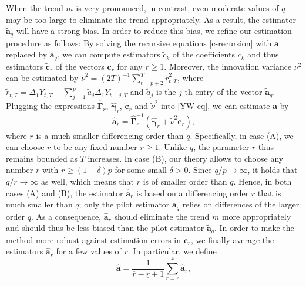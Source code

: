 \documentclass[a4paper]{scrartcl}
\begin{document}
When the trend $m$ is very pronounced, in contrast, even moderate values of $q$ may be too large to eliminate the trend appropriately. As a result, the estimator $\widetilde{\boldsymbol{a}}_q$ will have a strong bias. In order to reduce this bias, we refine our estimation procedure as follows: By solving the recursive equations \eqref{c-recursion} with $\boldsymbol{a}$ replaced by $\widetilde{\boldsymbol{a}}_q$, we can compute estimators $\widetilde{c}_k$ of the coefficients $c_k$ and thus estimators $\widetilde{\boldsymbol{c}}_r$ of the vectors $\boldsymbol{c}_r$ for any $r \ge 1$. Moreover, the innovation variance $\nu^2$ can be estimated by $\widetilde{\nu}^2 = (2T)^{-1} \sum_{t=p+2}^T \widetilde{r}_{t,T}^2$, where $\widetilde{r}_{t,T} = \Delta_1 Y_{t,T} - \sum_{j=1}^p \widetilde{a}_j \Delta_1 Y_{t-j,T}$ and $\widetilde{a}_j$ is the $j$-th entry of the vector $\widetilde{\boldsymbol{a}}_q$. Plugging the expressions $\widehat{\boldsymbol{\Gamma}}_r$, $\widehat{\boldsymbol{\gamma}}_r$, $\widetilde{\boldsymbol{c}}_r$ and $\widetilde{\nu}^2$ into \eqref{YW-eq}, we can estimate $\boldsymbol{a}$ by 
\begin{equation}\label{est-AR-SS} 
\widehat{\boldsymbol{a}}_r = \widehat{\boldsymbol{\Gamma}}_r^{-1} (\widehat{\boldsymbol{\gamma}}_r + \widetilde{\nu}^2 \widetilde{\boldsymbol{c}}_r),
\end{equation} 
where $r$ is a much smaller differencing order than $q$. Specifically, in case (A), we can choose $r$ to be any fixed number $r \ge 1$. Unlike $q$, the parameter $r$ thus remains bounded as $T$ increases. In case (B), our theory allows to choose any number $r$ with $r \ge (1+\delta) p$ for some small $\delta > 0$. Since $q/p \rightarrow \infty$, it holds that $q/r \rightarrow \infty$ as well, which means that $r$ is of smaller order than $q$. Hence, in both cases (A) and (B), the estimator $\widehat{\boldsymbol{a}}_r$ is based on a differencing order $r$ that is much smaller than $q$; only the pilot estimator $\widetilde{\boldsymbol{a}}_q$ relies on differences of the larger order $q$. As a consequence, $\widehat{\boldsymbol{a}}_r$ should eliminate the trend $m$ more appropriately and should thus be less biased than the pilot estimator $\widetilde{\boldsymbol{a}}_q$. In order to make the method more robust against estimation errors in $\widetilde{\boldsymbol{c}}_r$, we finally average the estimators $\widehat{\boldsymbol{a}}_r$ for a few values of $r$. In particular, we define  
\begin{equation}\label{est-AR}
\widehat{\boldsymbol{a}} = \frac{1}{\overline{r}-\underline{r}+1} \sum\limits_{r=\underline{r}}^{\overline{r}} \widehat{\boldsymbol{a}}_r, 
\end{equation}
\end{document}
